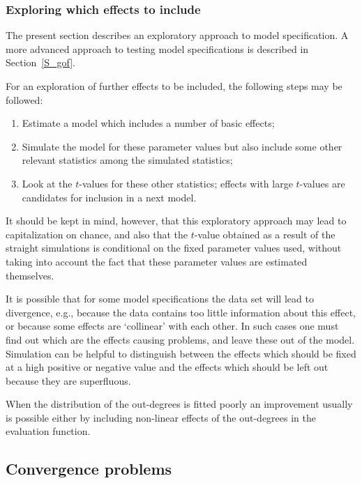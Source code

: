 \documentclass[a4paper,fleqn]{article}
\newcommand{\+}{\, + \,}
\begin{document}
{\subsubsection{Exploring which effects to include}

The present section describes an exploratory approach to model
specification. A more advanced approach to testing model
specifications is described in Section~\ref{S_gof}.

For an exploration of further effects to be included, the
following steps may be followed:
\begin{enumerate}
\item Estimate a model which includes a number of basic effects;
\item Simulate the model for these parameter values but
      also include some other relevant statistics
      among the simulated statistics;
\item Look at the $t$-values for these other statistics;
      effects with large $t$-values are candidates for inclusion
      in a next model.
\end{enumerate}
It should be kept in mind, however, that this exploratory approach
may lead to capitalization on chance, and also that the $t$-value
obtained as a result of the straight simulations is conditional on
the fixed parameter values used, without taking into account the
fact that these parameter values are estimated themselves.

It is possible that for some model specifications the data set
will lead to divergence, e.g., because the data contains too
little information about this effect, or because some effects are
`collinear' with each other. In such cases one must find out which
are the effects causing problems, and leave these out of the
model. Simulation can be helpful to distinguish between the
effects which should be fixed at a high positive or negative value
and the effects which should be left out because they are
superfluous.

When the distribution of the out-degrees is fitted poorly %
an improvement
usually is possible either by including non-linear effects of the
out-degrees in the evaluation function.

\subsection{Convergence problems}

}
\end{document}
